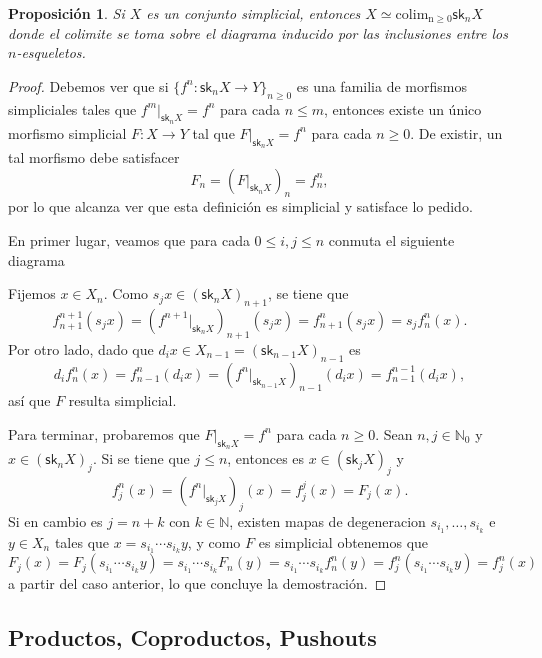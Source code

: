 \documentclass[11pt]{report}
\theoremstyle{colored}
\newtheorem{proposition}{Proposición}[section]
\newcommand{\N}{\mathbb{N}}
\newcommand{\sk}{\mathsf{sk}}
\begin{document}
\begin{proposition} Si $X$ es un conjunto simplicial, entonces $X \simeq \operatorname{colim_{n \geq 0}} \sk_nX$ donde el colimite se toma sobre el diagrama inducido por las inclusiones entre los $n$-esqueletos.
\end{proposition}
\begin{proof} Debemos ver que si $\{f^n : \sk_nX \to Y\}_{n\geq 0}$ es una familia de morfismos simpliciales tales que $f^m|_{\sk_nX} = f^n$ para cada $n \leq m$, entonces existe un único morfismo simplicial $F : X \to Y$ tal que $F|_{\sk_nX} = f^n$ para cada $n \geq 0$. De existir, un tal morfismo debe satisfacer
\[
F_n = (F|_{\sk_nX})_n = f^n_n, 
\]
por lo que alcanza ver que esta definición es simplicial y satisface lo pedido. 

En primer lugar, veamos que para cada $0\leq i,j \leq n $ conmuta el siguiente diagrama
\begin{center}
\end{center}
Fijemos $x \in X_n$. Como $s_jx \in (\sk_nX)_{n+1}$, se tiene que
\[
f^{n+1}_{n+1}(s_jx) = (f^{n+1}|_{\sk_nX})_{n+1}(s_jx) = f^n_{n+1}(s_jx) = s_jf^n_n(x).
\]
Por otro lado, dado que $d_ix \in X_{n-1} = (\sk_{n-1}X)_{n-1}$ es
\[
d_if^n_n(x) = f^n_{n-1}(d_ix) = (f^n|_{\sk_{n-1}X})_{n-1}(d_ix) = f^{n-1}_{n-1}(d_ix),
\]
así que $F$ resulta simplicial.

Para terminar, probaremos que $F|_{\sk_nX} = f^n$ para cada $n \geq 0$. Sean $n,j \in \N_0$ y $x \in (\sk_nX)_j$. Si se tiene que $j \leq n$, entonces es $x \in (\sk_jX)_j$ y
\[
f^n_j(x) = (f^n|_{\sk_jX})_j(x) = f^j_j(x) = F_j(x).
\]
Si en cambio es $j = n + k$ con $k \in \N$, existen mapas de degeneracion $s_{i_1},\dots,s_{i_{k}}$ e $y \in X_n$ tales que $x = s_{i_1}\cdots s_{i_{k}}y$, y como $F$ es simplicial obtenemos que
\[
F_j(x) = F_j(s_{i_1}\cdots s_{i_{k}}y) = s_{i_1}\cdots s_{i_{k}}F_n(y) = s_{i_1}\cdots s_{i_{k}}f^n_n(y) = f^n_j(s_{i_1}\cdots s_{i_{k}}y) = f^n_j(x)
\]
a partir del caso anterior, lo que concluye la demostración.
\end{proof}

\subsection{Productos, Coproductos, Pushouts}
\end{document}
